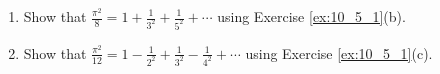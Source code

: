 \begin{multicols}{2}
\begin{ex}
\begin{enumerate}[label={\alph*.}]
\item Show that $ \frac{\pi^2}{8} = 1 + \frac{1}{3^2} + \frac{1}{5^2} + \cdots $ using Exercise \ref{ex:10_5_1}(b).

\item Show that $ \frac{\pi^2}{12} = 1 - \frac{1}{2^2} + \frac{1}{3^2} - \frac{1}{4^2} + \cdots $ using Exercise \ref{ex:10_5_1}(c).

\end{enumerate}
\end{ex}
\end{multicols}
